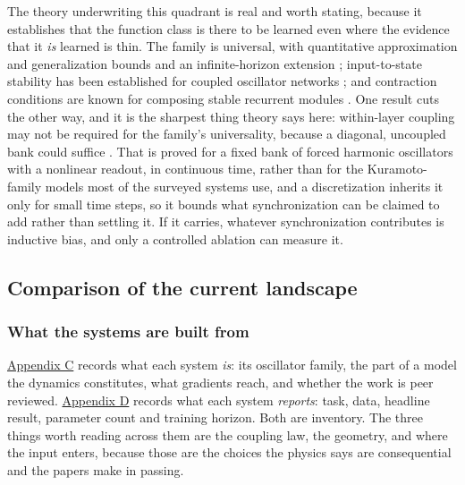 \documentclass[10pt]{article}
\begin{document}
The theory underwriting this quadrant is real and worth stating, because
it establishes that the function class is there to be learned even where
the evidence that it \emph{is} learned is thin. The family is universal,
with quantitative approximation and generalization bounds
\citep{huang, huang2025} and an infinite-horizon extension
\citep{sagodi}; input-to-state stability has been established for
coupled oscillator networks \citep{stolzle2024}; and contraction
conditions are known for composing stable recurrent modules
\citep{kozachkov2022}. One result cuts the other way, and it is the
sharpest thing theory says here: within-layer coupling may not be
required for the family's universality, because a diagonal, uncoupled
bank could suffice \citep{lanthaler2023}. That is proved for a fixed
bank of forced harmonic oscillators with a nonlinear readout, in
continuous time, rather than for the Kuramoto-family models most of the
surveyed systems use, and a discretization inherits it only for small
time steps, so it bounds what synchronization can be claimed to add
rather than settling it. If it carries, whatever synchronization
contributes is inductive bias, and only a controlled ablation can
measure it.

\subsection{Comparison of the current landscape}\label{sec-2-3}

\subsubsection{What the systems are built from}\label{sec-2-3-1}

\hyperref[sec-C]{Appendix C} records what each system \emph{is}: its
oscillator family, the part of a model the dynamics constitutes, what
gradients reach, and whether the work is peer reviewed.
\hyperref[sec-D]{Appendix D} records what each system \emph{reports}:
task, data, headline result, parameter count and training horizon. Both
are inventory. The three things worth reading across them are the
coupling law, the geometry, and where the input enters, because those
are the choices the physics says are consequential and the papers make
in passing.
\end{document}
